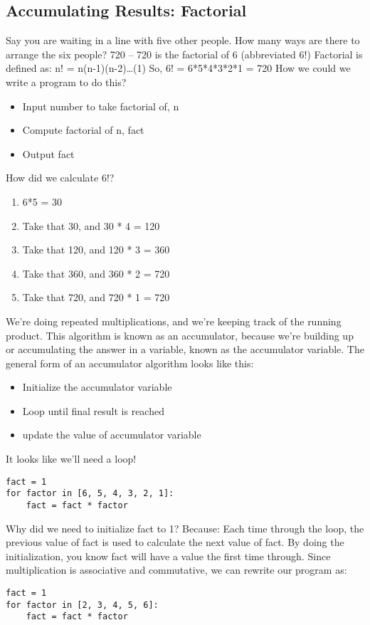\documentclass[12pt,a4paper,final,twoside,onecolumn,titlepage]{book}
\begin{document}
\subsection{Accumulating Results: Factorial}
Say you are waiting in a line with five other people. How many ways are there to arrange the six people?
720 -- 720 is the factorial of 6 (abbreviated 6!)
Factorial is defined as:
n! = n(n-1)(n-2)…(1)
So, 6! = 6*5*4*3*2*1 = 720
How we could we write a program to do this?
\begin{itemize}
\item Input number to take factorial of, n
\item Compute factorial of n, fact
\item Output fact
\end{itemize}
How did we calculate 6!?
\begin{enumerate}
\item 6*5 = 30
\item Take that 30, and 30 * 4 = 120
\item Take that 120, and 120 * 3 = 360
\item Take that 360, and 360 * 2 = 720
\item Take that 720, and 720 * 1 = 720
\end{enumerate}
We’re doing repeated multiplications, and we’re keeping track of the running product. This algorithm is known as an accumulator, because we’re building up or accumulating the answer in a variable, known as the accumulator variable.
The general form of an accumulator algorithm looks like this:
\begin{itemize}
\item Initialize the accumulator variable
\item Loop until final result is reached
\item update the value of accumulator variable
\end{itemize}
It looks like we’ll need a loop!
\lstset{language=Python, tabsize=4}
\begin{lstlisting}
fact = 1
for factor in [6, 5, 4, 3, 2, 1]:
	fact = fact * factor
\end{lstlisting}
Why did we need to initialize fact to 1? Because: Each time through the loop, the previous value of fact is used to calculate the next value of fact. By doing the initialization, you know fact will have a value the first time through. Since multiplication is associative and commutative, we can rewrite our program as:
\lstset{language=Python, tabsize=4}
\begin{lstlisting}
fact = 1
for factor in [2, 3, 4, 5, 6]:
	fact = fact * factor
\end{lstlisting}
\end{document}
